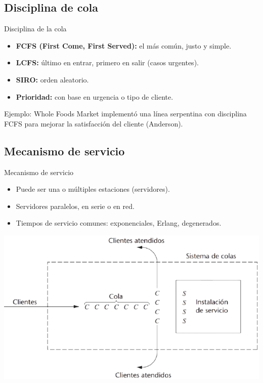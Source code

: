 \documentclass{beamer}
\begin{document}
\subsection{Disciplina de cola}
\begin{frame}{Disciplina de la cola}
\begin{itemize}
    \item \textbf{FCFS (First Come, First Served):} el más común, justo y simple.
    \item \textbf{LCFS:} último en entrar, primero en salir (casos urgentes).
    \item \textbf{SIRO:} orden aleatorio.
    \item \textbf{Prioridad:} con base en urgencia o tipo de cliente.
\end{itemize}
\vspace{0.3cm}
Ejemplo: Whole Foods Market implementó una línea serpentina con disciplina FCFS para mejorar la satisfacción del cliente (Anderson).
\end{frame}

\subsection{Mecanismo de servicio}
\begin{frame}{Mecanismo de servicio}
    \begin{itemize}
        \item Puede ser una o múltiples estaciones (servidores).
        \item Servidores paralelos, en serie o en red.
        \item Tiempos de servicio comunes: exponenciales, Erlang, degenerados.
    \end{itemize}
\includegraphics[width=0.8\linewidth]{images/servidores.png}
\end{frame}
\end{document}
